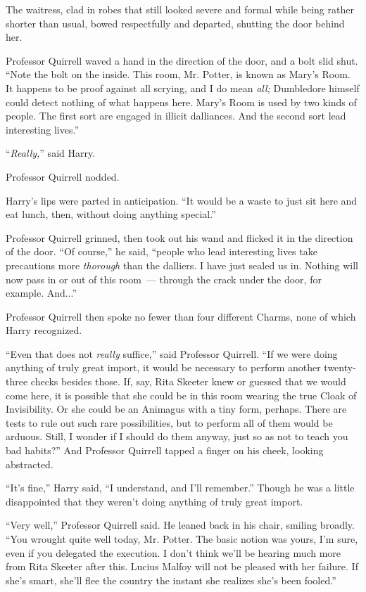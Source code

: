The waitress, clad in robes that still looked severe and formal while being rather shorter than usual, bowed respectfully and departed, shutting the door behind her.

Professor Quirrell waved a hand in the direction of the door, and a bolt slid shut. ``Note the bolt on the inside. This room, Mr. Potter, is known as Mary's Room. It happens to be proof against all scrying, and I do mean \emph{all;} Dumbledore himself could detect nothing of what happens here. Mary's Room is used by two kinds of people. The first sort are engaged in illicit dalliances. And the second sort lead interesting lives.''

``\emph{Really,}'' said Harry.

Professor Quirrell nodded.

Harry's lips were parted in anticipation. ``It would be a waste to just sit here and eat lunch, then, without doing anything special.''

Professor Quirrell grinned, then took out his wand and flicked it in the direction of the door. ``Of course,'' he said, ``people who lead interesting lives take precautions more \emph{thorough} than the dalliers. I have just sealed us in. Nothing will now pass in or out of this room~--- through the crack under the door, for example. And...''

Professor Quirrell then spoke no fewer than four different Charms, none of which Harry recognized.

``Even that does not \emph{really} suffice,'' said Professor Quirrell. ``If we were doing anything of truly great import, it would be necessary to perform another twenty-three checks besides those. If, say, Rita Skeeter knew or guessed that we would come here, it is possible that she could be in this room wearing the true Cloak of Invisibility. Or she could be an Animagus with a tiny form, perhaps. There are tests to rule out such rare possibilities, but to perform all of them would be arduous. Still, I wonder if I should do them anyway, just so as not to teach you bad habits?'' And Professor Quirrell tapped a finger on his cheek, looking abstracted.

``It's fine,'' Harry said, ``I understand, and I'll remember.'' Though he was a little disappointed that they weren't doing anything of truly great import.

``Very well,'' Professor Quirrell said. He leaned back in his chair, smiling broadly. ``You wrought quite well today, Mr. Potter. The basic notion was yours, I'm sure, even if you delegated the execution. I don't think we'll be hearing much more from Rita Skeeter after this. Lucius Malfoy will not be pleased with her failure. If she's smart, she'll flee the country the instant she realizes she's been fooled.''

